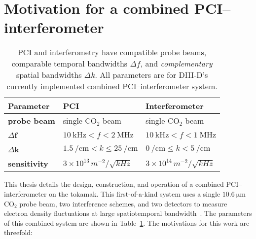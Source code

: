 \section{Motivation for a combined PCI--interferometer}
\begin{table}
  \centering
  \renewcommand{\arraystretch}{1.25}%
  \begin{tabular}{%
    >{\centering}m{2.25cm} >{\centering}m{4.1cm} >{\centering}m{4.0cm}
  }
    \toprule%
    \textbf{Parameter} & \textbf{PCI} & \textbf{Interferometer}
    \tabularnewline%
    \midrule
    \textbf{probe beam} & single CO$_2$ beam & single CO$_2$ beam
    \tabularnewline%
    $\Delta$\textbf{f}
    & $\SI{10}{\kilo\hertz} < f < \SI{2}{\mega\hertz}$
    & $\SI{10}{\kilo\hertz} < f < \SI{1}{\mega\hertz}$
    \tabularnewline%
    $\Delta$\textbf{k}
    & $\SI{1.5}{\per\centi\meter} < k \leq \SI{25}{\per\centi\meter}$
    & $\SI{0}{\per\centi\meter} \leq k < \SI{5}{\per\centi\meter}$
    \tabularnewline%
    \textbf{sensitivity}
    & $3 \times 10^{13} \, m^{-2} / \sqrt{kHz}$
    & $3 \times 10^{14} \, m^{-2} / \sqrt{kHz}$
    \tabularnewline%
    \toprule%
  \end{tabular}
  \caption[Parameters of \diiid's combined PCI-interferometer]{%
    PCI and interferometry have compatible probe beams,
    comparable temporal bandwidths $\Delta f$, and
    \emph{complementary} spatial bandwidths $\Delta k$.
    All parameters are for DIII-D's currently implemented
    combined PCI--interferometer system.
  }%
\label{table:Introduction:PCI_interferometer}
\end{table}

This thesis details the design, construction, and operation
of a combined PCI--interferometer on the \diiid\space tokamak.
This first-of-a-kind system uses
a single $\SI{10.6}{\micro\meter}$ CO$_2$ probe beam,
two interference schemes, and
two detectors
to measure electron density fluctuations
at large spatiotemporal bandwidth~\cite{davis_rsi16}.
The parameters of this combined system are shown in
Table~\ref{table:Introduction:PCI_interferometer}.
The motivations for this work are threefold:

